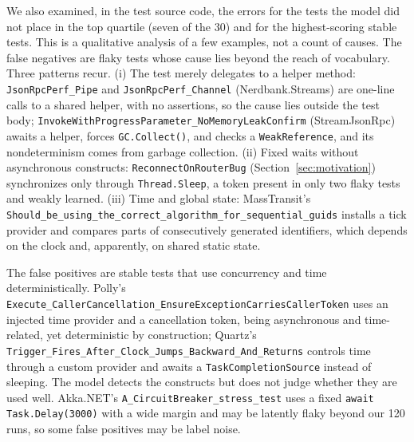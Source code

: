 We also examined, in the test source code, the errors for the tests the model did not place in the top quartile (seven of the 30) and for the highest-scoring stable tests.  This is a qualitative analysis of a few examples, not a count of causes. The false negatives are flaky tests whose cause lies beyond the reach of vocabulary. Three patterns recur. (i) The test merely delegates to a helper method: \texttt{JsonRpcPerf\_Pipe} and \texttt{JsonRpcPerf\_Channel} (Nerdbank.Streams) are one-line calls to a shared helper, with no assertions, so the cause lies outside the test body; \texttt{InvokeWithProgressParameter\_\allowbreak NoMemoryLeakConfirm} (StreamJsonRpc) awaits a helper, forces \texttt{GC.Collect()}, and checks a \texttt{WeakReference}, and its nondeterminism comes from garbage collection. (ii) Fixed waits without asynchronous constructs: \texttt{ReconnectOnRouterBug} (Section~\ref{sec:motivation}) synchronizes only through \texttt{Thread.Sleep}, a token present in only two flaky tests and weakly learned. (iii) Time and global state: MassTransit's \texttt{Should\_be\_using\_the\_\allowbreak correct\_algorithm\_\allowbreak for\_sequential\_guids} installs a tick provider and compares parts of consecutively generated identifiers, which depends on the clock and, apparently, on shared static state.

The false positives are stable tests that use concurrency and time deterministically. Polly's \texttt{Execute\_CallerCancellation\_\allowbreak EnsureExceptionCarriesCallerToken} uses an injected time provider and a cancellation token, being asynchronous and time-related, yet deterministic by construction; Quartz's \texttt{Trigger\_Fires\_After\_Clock\_\allowbreak Jumps\_Backward\_And\_Returns} controls time through a custom provider and awaits a \texttt{TaskCompletionSource} instead of sleeping. The model detects the constructs but does not judge whether they are used well. Akka.NET's \texttt{A\_CircuitBreaker\_stress\_test} uses a fixed \texttt{await Task.Delay(3000)} with a wide margin and may be latently flaky beyond our 120 runs, so some false positives may be label noise. 

